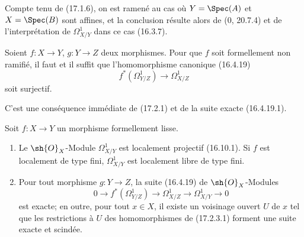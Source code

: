 Compte tenu de (17.1.6), on est ramené au cas où $Y=\Spec(A)$ et $X=\Spec(B)$ sont affines, et la conclusion résulte alors de (0, 20.7.4) et de l'interprétation de $\Omega_{X/Y}^1$ dans ce cas (16.3.7).

\begin{corollary}[17.2.2]
\label{IV.17.2.2}
Soient $f:X\to Y$, $g:Y\to Z$ deux morphismes. Pour que $f$ soit formellement non ramifié, il faut et il suffit que l'homomorphisme canonique (16.4.19)
\[
  f^*(\Omega_{Y/Z}^1)\longrightarrow\Omega_{X/Z}^1
\]
soit surjectif.
\end{corollary}

C'est une conséquence immédiate de (17.2.1) et de la suite exacte (16.4.19.1).

\begin{proposition}[17.2.3]
\label{IV.17.2.3}
Soit $f:X\to Y$ un morphisme formellement lisse.
\begin{enumerate}
  \item[(i)] Le $\sh{O}_X$-Module $\Omega_{X/Y}^1$ est localement projectif (16.10.1). Si $f$ est localement de type fini, $\Omega_{X/Y}^1$ est localement libre de type fini.
  \item[(ii)] Pour tout morphisme $g:Y\to Z$, la suite (16.4.19) de $\sh{O}_X$-Modules
  \[
  \label{IV.17.2.3.1}
    0\longrightarrow f^*(\Omega_{Y/Z}^1)\longrightarrow\Omega_{X/Z}^1\longrightarrow\Omega_{X/Y}^1\longrightarrow0
    \tag{17.2.3.1}
  \]
  est exacte; en outre, pour tout $x\in X$, il existe un voisinage ouvert $U$ de $x$ tel que les restrictions à $U$ des homomorphismes de (17.2.3.1) forment une suite exacte et scindée.
\end{enumerate}
\end{proposition}

